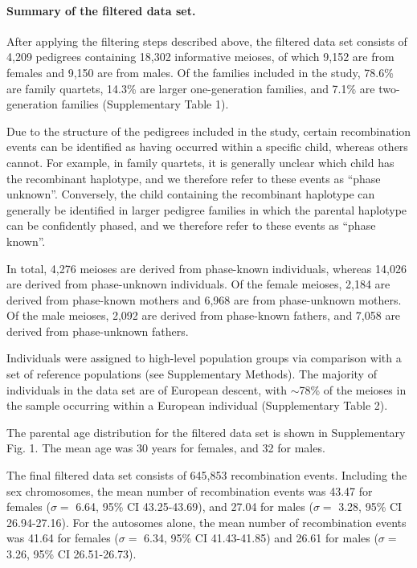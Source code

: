 \paragraph{Summary of the filtered data set.} After applying the filtering steps described
above, the filtered data set consists of 4,209 pedigrees containing 18,302
informative meioses, of which 9,152 are from females and 9,150 are from males.
Of the families included in the study, 78.6\% are family quartets, 14.3\% are larger
one-generation families, and 7.1\% are two-generation families (Supplementary
Table 1).

Due to the structure of the pedigrees included in the study, certain
recombination events can be identified as having occurred within a specific child,
whereas others cannot. For example, in family quartets, it is generally unclear
which child has the recombinant haplotype, and we therefore refer to these events
as ``phase unknown''. Conversely, the child containing the recombinant haplotype
can generally be identified in larger pedigree families in which the parental
haplotype can be confidently phased, and we therefore refer to these events as
``phase known''.

In total, 4,276 meioses are derived from phase-known individuals, whereas
14,026 are derived from phase-unknown individuals. Of the female meioses, 2,184
are derived from phase-known mothers and 6,968 are from phase-unknown
mothers. Of the male meioses, 2,092 are derived from phase-known fathers, and
7,058 are derived from phase-unknown fathers.

Individuals were assigned to high-level population groups via comparison with
a set of reference populations (see Supplementary Methods). The majority of
individuals in the data set are of European descent, with $\sim$78\% of the meioses in
the sample occurring within a European individual (Supplementary Table 2).

The parental age distribution for the filtered data set is shown in Supplementary
Fig. 1. The mean age was 30 years for females, and 32 for males.

The final filtered data set consists of 645,853 recombination events. Including
the sex chromosomes, the mean number of recombination events was 43.47 for
females ($\sigma=$ 6.64, 95\% CI 43.25-43.69), and 27.04 for males ($\sigma=$ 3.28, 95\% CI
26.94-27.16). For the autosomes alone, the mean number of recombination events
was 41.64 for females ($\sigma=$ 6.34, 95\% CI 41.43-41.85) and 26.61 for males
($\sigma=$ 3.26, 95\% CI 26.51-26.73).

